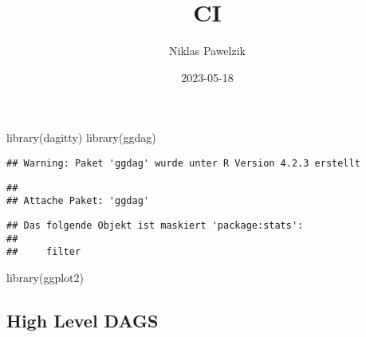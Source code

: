 \documentclass[
]{article}
\title{CI}
\author{Niklas Pawelzik}
\date{2023-05-18}
\newenvironment{Shaded}{\begin{snugshade}}{\end{snugshade}}
\newcommand{\FunctionTok}[1]{\textcolor[rgb]{0.00,0.00,0.00}{#1}}
\newcommand{\NormalTok}[1]{#1}
\begin{document}
\maketitle

\begin{Shaded}
\begin{Highlighting}[]
\FunctionTok{library}\NormalTok{(dagitty)}
\FunctionTok{library}\NormalTok{(ggdag)}
\end{Highlighting}
\end{Shaded}

\begin{verbatim}
## Warning: Paket 'ggdag' wurde unter R Version 4.2.3 erstellt
\end{verbatim}

\begin{verbatim}
## 
## Attache Paket: 'ggdag'
\end{verbatim}

\begin{verbatim}
## Das folgende Objekt ist maskiert 'package:stats':
## 
##     filter
\end{verbatim}

\begin{Shaded}
\begin{Highlighting}[]
\FunctionTok{library}\NormalTok{(ggplot2)}
\end{Highlighting}
\end{Shaded}

\hypertarget{high-level-dags}{%
\subsection{High Level DAGS}\label{high-level-dags}}
\end{document}
